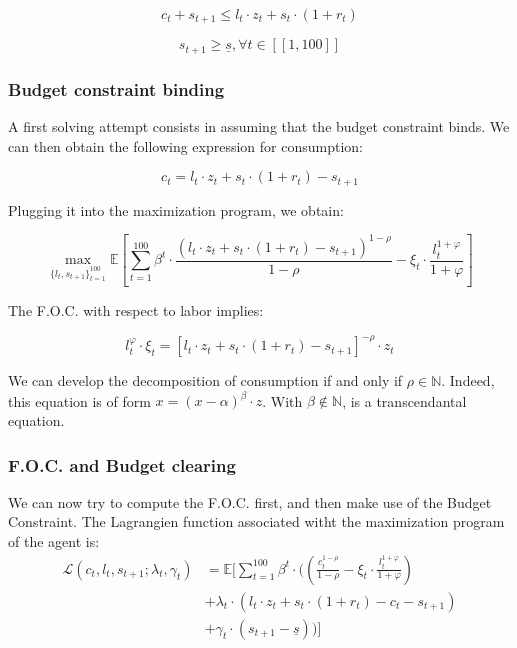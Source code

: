 \documentclass{article}
\begin{document}
$$c_{t} + s_{t+1} \leq l_{t}\cdot z_{t} + s_{t}\cdot(1+r_{t})$$

$$s_{t+1}\geq \underline{s}, \forall t \in [\![1,100]\!]$$

\subsubsection{Budget constraint binding}

A first solving attempt consists in assuming that the budget constraint binds.
We can then obtain the following expression for consumption: 

$$c_{t} = l_{t}\cdot z_{t} + s_{t}\cdot(1+r_{t}) - s_{t+1}$$

Plugging it into the maximization program, we obtain:

$$ \max_{\{l_{t},s_{t+1}\}_{t=1}^{100}}
{\mathbb{E}\left[\sum_{t=1}^{100} \beta^{t}\cdot \frac{\left(l_{t}\cdot z_{t} + s_{t}\cdot(1+r_{t}) - s_{t+1}\right)^{1-\rho}}{1-\rho}-\xi_{t}\cdot \frac{l_{t}^{1+\varphi}}{1+\varphi}\right]}$$

The F.O.C. with respect to labor implies: 

\begin{equation}
    l_{t}^{\varphi}\cdot \xi_{t} = \left[l_{t}\cdot z_{t} + s_{t}\cdot(1+r_{t})- s_{t+1}\right]^{-\rho}\cdot z_{t}
\end{equation}

We can develop the decomposition of consumption if and only if $\rho \in \mathbb{N}$.
Indeed, this equation is of form $x = (x-\alpha)^{\beta} \cdot z$.
With $\beta\notin \mathbb{N}$, is a transcendantal equation.

\subsubsection{F.O.C. and Budget clearing}

We can now try to compute the F.O.C. first, and then make use of the Budget Constraint.
The Lagrangien function associated witht the maximization program of the agent is: 
\begin{equation}
    \begin{split}
        \mathcal{L}(c_{t},l_{t},s_{t+1};\lambda_t,\gamma_{t}) &
        = \mathbb{E}\Big[\sum_{t=1}^{100} \beta^{t}\cdot ((\frac{c_{t}^{1-\rho}}{1-\rho}-\xi_{t}\cdot\frac{l_{t}^{1+\varphi}}{1+\varphi}) \\
        & +\lambda_{t}\cdot \left(l_{t}\cdot z_{t}+s_{t}\cdot (1+r_{t})-c_{t}-s_{t+1}\right) \\ 
        & + \gamma_{t}\cdot \left(s_{t+1}-\underline{s}\right))\Big] \\ 
    \end{split}
\end{equation}
\end{document}
